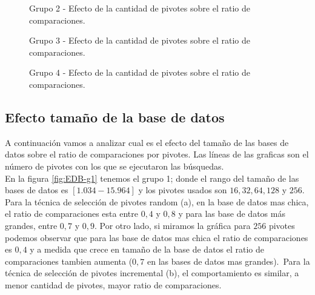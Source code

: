 \begin{figure}[H]
\centering
{}
		\caption{\small Grupo 2 - Efecto de la cantidad de pivotes sobre el ratio de comparaciones.}
		\label{fig:EP-g2}
\end{figure}

\begin{figure}[H]
\centering
{}
		\caption{\small Grupo 3 - Efecto de la cantidad de pivotes sobre el ratio de comparaciones.}
		\label{fig:EP-g3}
\end{figure}

\begin{figure}[H]
\centering	
{}
		\caption{\small Grupo 4 - Efecto de la cantidad de pivotes sobre el ratio de comparaciones.}
		\label{fig:EP-g4}
\end{figure}

\subsection{Efecto tamaño de la base de datos}

A continuaci\'on vamos a analizar cual es el efecto del tama\~no de las bases de datos sobre el ratio de comparaciones por pivotes. Las l\'ineas de las graficas son el n\'umero de pivotes con los que se ejecutaron las b\'usquedas.\\

En la figura \ref{fig:EDB-g1} tenemos el grupo 1; donde el rango del tama\~no de las bases de datos es $[1.034-15.964]$ y los pivotes usados son $16, 32, 64, 128$ y $256$. Para la t\'ecnica de selecci\'on de pivotes random (a), en la base de datos mas chica, el ratio de comparaciones esta entre $0,4$ y $0,8$ y para las base de datos m\'as grandes, entre $0,7$ y $0,9$. Por otro lado, si miramos la gr\'afica para $256$ pivotes podemos observar que para las base de datos mas chica el ratio de comparaciones es $0,4$ y a medida que crece en tama\~no de la base de datos el ratio de comparaciones tambien aumenta ($0,7$ en las bases de datos mas grandes).\
Para la t\'ecnica de selecci\'on de pivotes incremental (b), el comportamiento es similar, a menor cantidad de pivotes, mayor ratio de comparaciones.\\

